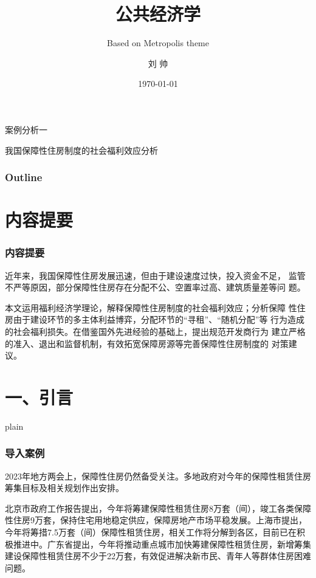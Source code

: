 \documentclass[aspectratio=169, 12pt]{beamer}
\title{公共经济学}
\subtitle{Based on Metropolis theme}
\author[LIU ShHUAI]{刘 {  } 帅}
\institute{山西师范大学 {  } 经济与管理学院}
\date{\today}
\begin{document}
\maketitle

\begin{frame}[standout]
    案例分析一\par
    \addtolength{\parskip}{.4em}
    我国保障性住房制度的社会福利效应分析
\end{frame}

\begin{frame}[plain]
    \frametitle{Outline}
    \tableofcontents[hideallsubsections]
  \end{frame}

\section{内容提要}

\begin{frame}[plain]
    \frametitle{内容提要}
    近年来，我国保障性住房发展迅速，但由于建设速度过快，投入资金不足，
监管不严等原因，部分保障性住房存在分配不公、空置率过高、建筑质量差等问
题。\par
本文运用福利经济学理论，解释保障性住房制度的社会福利效应；分析保障
性住房由于建设环节的多主体利益博弈，分配环节的“寻租”、“随机分配”等
行为造成的社会福利损失。在借鉴国外先进经验的基础上，提出规范开发商行为
建立严格的准入、退出和监督机制，有效拓宽保障房源等完善保障性住房制度的
对策建议。
\end{frame}

\section{一、引言}

\begin{frame}{plain}
    \frametitle{导入案例}
    2023年地方两会上，保障性住房仍然备受关注。多地政府对今年的保障性租赁住房筹集目标及相关规划作出安排。
    \par
    北京市政府工作报告提出，今年将筹建保障性租赁住房8万套（间），竣工各类保障性住房9万套，保持住宅用地稳定供应，保障房地产市场平稳发展。上海市提出，今年将筹措7.5万套（间）保障性租赁住房，相关工作将分解到各区，目前已在积极推进中。广东省提出，今年将推动重点城市加快筹建保障性租赁住房，新增筹集建设保障性租赁住房不少于22万套，有效促进解决新市民、青年人等群体住房困难问题。
\end{frame}
\end{document}
